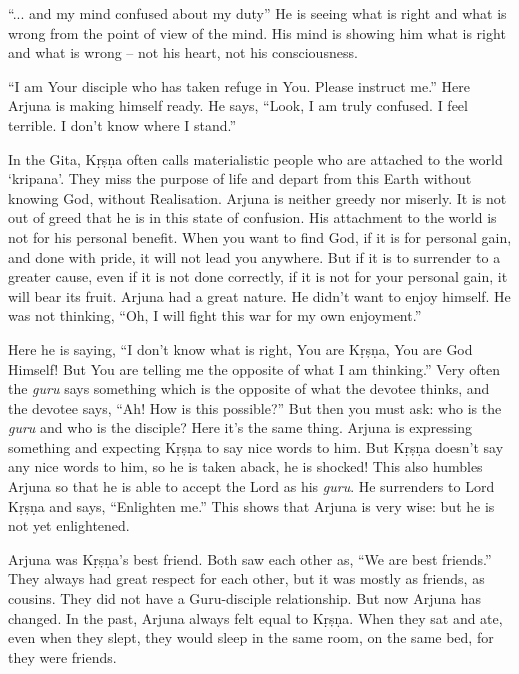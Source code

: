 “... and my mind confused about my duty” He is seeing what is right and what is wrong from the point of view of the mind. His mind is showing him what is right and what is wrong – not his heart, not his consciousness.

“I am Your disciple who has taken refuge in You. Please instruct me.” Here Arjuna is making himself ready. He says, “Look, I am truly confused. I feel terrible. I don’t know where I stand.”

In the Gita, Kṛṣṇa often calls materialistic people who are attached to the world ‘kripana’. They miss the purpose of life and depart from this Earth without knowing God, without Realisation. Arjuna is neither greedy nor miserly. It is not out of greed that he is in this state of confusion. His attachment to the world is not for his personal benefit. When you want to find God, if it is for personal gain, and done with pride, it will not lead you anywhere. But if it is to surrender to a greater cause, even if it is not done correctly, if it is not for your personal gain, it will bear its fruit. Arjuna had a great nature. He didn’t want to enjoy himself. He was not thinking, “Oh, I will fight this war for my own enjoyment.”

Here he is saying, “I don’t know what is right, You are Kṛṣṇa, You are God Himself! But You are telling me the opposite of what I am thinking.” Very often the \textit{guru} says something which is the opposite of what the devotee thinks, and the devotee says, “Ah! How is this possible?” But then you must ask: who is the \textit{guru} and who is the disciple? Here it’s the same thing. Arjuna is expressing something and expecting Kṛṣṇa to say nice words to him. But Kṛṣṇa doesn’t say any nice words to him, so he is taken aback, he is shocked! This also humbles Arjuna so that he is able to accept the Lord as his \textit{guru}. He surrenders to Lord Kṛṣṇa and says, “Enlighten me.” This shows that Arjuna is very wise: but he is not yet enlightened.

Arjuna was Kṛṣṇa’s best friend. Both saw each other as, “We are best friends.” They always had great respect for each other, but it was mostly as friends, as cousins. They did not have a Guru-disciple relationship. But now Arjuna has changed. In the past, Arjuna always felt equal to Kṛṣṇa. When they sat and ate, even when they slept, they would sleep in the same room, on the same bed, for they were friends.

